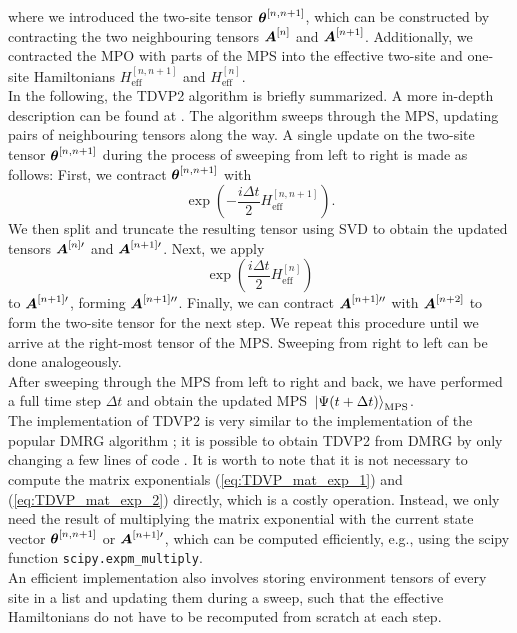 where we introduced the two-site tensor $\vb*{\theta}^{[n, n+1]}$, which can be constructed by contracting the two neighbouring
tensors $\vb*{A}^{[n]}$ and $\vb*{A}^{[n+1]}$. Additionally, we contracted the MPO with parts of the MPS into the
effective two-site and one-site Hamiltonians $H_\text{eff}^{[n,n+1]}$ and $H_\text{eff}^{[n]}$. \\
In the following, the TDVP2 algorithm is briefly summarized. A more in-depth description can be found at \cite{Vanderstraeten:2019,Haegeman:2016,Website:TDVP}.
The algorithm sweeps through the MPS, updating pairs of neighbouring tensors along the way. A single update on the two-site tensor $\vb*{\theta}^{[n, n+1]}$
during the process of sweeping from left to right is made as follows: 
First, we contract $\vb*{\theta}^{[n, n+1]}$ with
\begin{equation}
    \label{eq:TDVP_mat_exp_1}
     \exp\left(-\frac{i\Delta t}{2}H_\text{eff}^{[n, n+1]}\right).
\end{equation}
We then split and truncate the resulting tensor using SVD to obtain the updated tensors $\vb*{A}^{[n]\prime}$ and $\vb*{A}^{[n+1]\prime}$.
Next, we apply 
\begin{equation}
    \label{eq:TDVP_mat_exp_2}
    \exp\left(\frac{i\Delta t}{2}H_\text{eff}^{[n]}\right)
\end{equation}
to $\vb*{A}^{[n+1]\prime}$, forming $\vb*{A}^{[n+1]\prime\prime}$. Finally, we can contract 
$\vb*{A}^{[n+1]\prime\prime}$ with $\vb*{A}^{[n+2]}$ to form the two-site tensor for the next step.
We repeat this procedure until we arrive at the right-most tensor of the MPS. Sweeping from right to left can be done analogeously. \\
After sweeping through the MPS from left to right and back, we have performed a full time step $\Delta t$ and obtain the updated MPS
$\ket*{\Psi(t+\Delta t)}_\text{MPS}$.\\
The implementation of TDVP2 is very similar to the implementation of the popular DMRG algorithm \cite{Schollwöck:2011};
it is possible to obtain TDVP2 from DMRG by only changing a few lines of code \cite{Haegeman:2016}. It is worth to note that 
it is not necessary to compute the matrix exponentials (\ref{eq:TDVP_mat_exp_1}) and (\ref{eq:TDVP_mat_exp_2}) directly, which is a costly
operation. Instead, we only need the result of multiplying the matrix exponential with the current state vector $\vb*{\theta}^{[n, n+1]}$ or $\vb*{A}^{[n+1]\prime}$,
which can be computed efficiently, e.g., using the scipy function \verb|scipy.expm_multiply|. \\
An efficient implementation also involves storing environment tensors of every site in a list and updating them during a sweep,
such that the effective Hamiltonians do not have to be recomputed from scratch at each step.